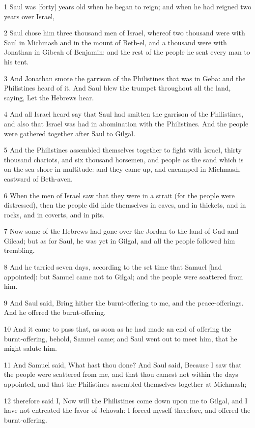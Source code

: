 \par 1 Saul was [forty] years old when he began to reign; and when he had reigned two years over Israel,
\par 2 Saul chose him three thousand men of Israel, whereof two thousand were with Saul in Michmash and in the mount of Beth-el, and a thousand were with Jonathan in Gibeah of Benjamin: and the rest of the people he sent every man to his tent.
\par 3 And Jonathan smote the garrison of the Philistines that was in Geba: and the Philistines heard of it. And Saul blew the trumpet throughout all the land, saying, Let the Hebrews hear.
\par 4 And all Israel heard say that Saul had smitten the garrison of the Philistines, and also that Israel was had in abomination with the Philistines. And the people were gathered together after Saul to Gilgal.
\par 5 And the Philistines assembled themselves together to fight with Israel, thirty thousand chariots, and six thousand horsemen, and people as the sand which is on the sea-shore in multitude: and they came up, and encamped in Michmash, eastward of Beth-aven.
\par 6 When the men of Israel saw that they were in a strait (for the people were distressed), then the people did hide themselves in caves, and in thickets, and in rocks, and in coverts, and in pits.
\par 7 Now some of the Hebrews had gone over the Jordan to the land of Gad and Gilead; but as for Saul, he was yet in Gilgal, and all the people followed him trembling.
\par 8 And he tarried seven days, according to the set time that Samuel [had appointed]: but Samuel came not to Gilgal; and the people were scattered from him.
\par 9 And Saul said, Bring hither the burnt-offering to me, and the peace-offerings. And he offered the burnt-offering.
\par 10 And it came to pass that, as soon as he had made an end of offering the burnt-offering, behold, Samuel came; and Saul went out to meet him, that he might salute him.
\par 11 And Samuel said, What hast thou done? And Saul said, Because I saw that the people were scattered from me, and that thou camest not within the days appointed, and that the Philistines assembled themselves together at Michmash;
\par 12 therefore said I, Now will the Philistines come down upon me to Gilgal, and I have not entreated the favor of Jehovah: I forced myself therefore, and offered the burnt-offering.
